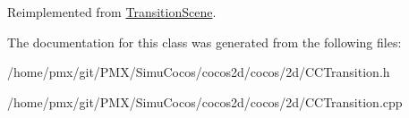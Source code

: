 Reimplemented from \hyperlink{classTransitionScene_aace390a1bd8f3c73bb650a1e256a0f83}{Transition\+Scene}.



The documentation for this class was generated from the following files\+:\begin{DoxyCompactItemize}
\item 
/home/pmx/git/\+P\+M\+X/\+Simu\+Cocos/cocos2d/cocos/2d/C\+C\+Transition.\+h\item 
/home/pmx/git/\+P\+M\+X/\+Simu\+Cocos/cocos2d/cocos/2d/C\+C\+Transition.\+cpp\end{DoxyCompactItemize}
